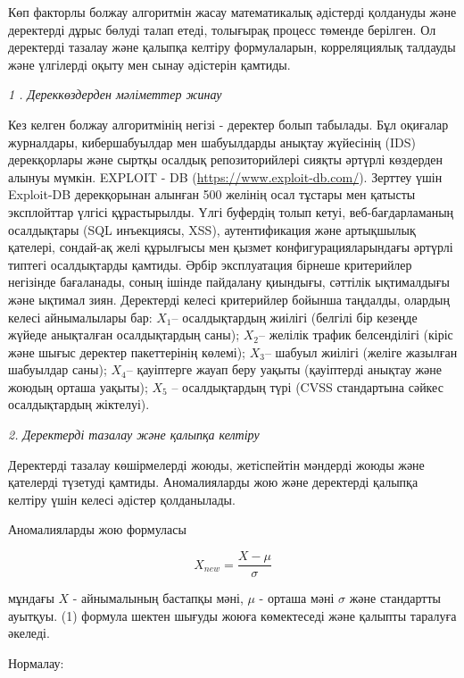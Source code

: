 \begin{multicols}{2}
Көп факторлы болжау алгоритмін жасау математикалық әдістерді қолдануды
және деректерді дұрыс бөлуді талап етеді, толығырақ процесс төменде
берілген. Ол деректерді тазалау және қалыпқа келтіру формулаларын,
корреляциялық талдауды және үлгілерді оқыту мен сынау әдістерін қамтиды.

\emph{1 . Дереккөздерден мәліметтер жинау}

Кез келген болжау алгоритмінің негізі - деректер болып табылады. Бұл
оқиғалар журналдары, кибершабуылдар мен шабуылдарды анықтау жүйесінің
(IDS) дерекқорлары және сыртқы осалдық репозиторийлері сияқты әртүрлі
көздерден алынуы мүмкін. EXPLOIT - DB
(\href{https://www.exploit-db.com/\%20}{https://www.exploit-db.com/}).
Зерттеу үшін Exploit-DB дерекқорынан алынған 500 желінің осал тұстары
мен қатысты эксплойттар үлгісі құрастырылды. Үлгі буфердің толып кетуі,
веб-бағдарламаның осалдықтары (SQL инъекциясы, XSS), аутентификация және
артықшылық қателері, сондай-ақ желі құрылғысы мен қызмет
конфигурацияларындағы әртүрлі типтегі осалдықтарды қамтиды. Әрбір
эксплуатация бірнеше критерийлер негізінде бағаланады, соның ішінде
пайдалану қиындығы, сәттілік ықтималдығы және ықтимал зиян. Деректерді
келесі критерийлер бойынша таңдалды, олардың келесі айнымалылары бар:
\(X_{1}\)-- осалдықтардың жиілігі (белгілі бір кезеңде жүйеде анықталған
осалдықтардың саны); \(X_{2}\)-- желілік трафик белсенділігі (кіріс және
шығыс деректер пакеттерінің көлемі); \(X_{3}\)-- шабуыл жиілігі (желіге
жазылған шабуылдар саны); \(X_{4}\)-- қауіптерге жауап беру уақыты
(қауіптерді анықтау және жоюдың орташа уақыты); \(X_{5}\) --
осалдықтардың түрі (CVSS стандартына сәйкес осалдықтардың жіктелуі).

\emph{2. Деректерді тазалау және қалыпқа келтіру}

Деректерді тазалау көшірмелерді жоюды, жетіспейтін мәндерді жоюды және
қателерді түзетуді қамтиды. Аномалияларды жою және деректерді қалыпқа
келтіру үшін келесі әдістер қолданылады.

Аномалияларды жою формуласы

\begin{equation}
X_{new} = \frac{X - \mu}{\sigma}
\end{equation}

мұндағы \(X\) - айнымалының бастапқы мәні, \(\mu\) - орташа мәні
\(\sigma\) және стандартты ауытқуы. (1) формула шектен шығуды жоюға
көмектеседі және қалыпты таралуға әкеледі.

Нормалау:


\end{multicols}
